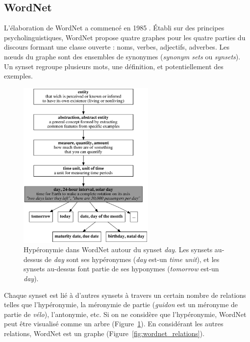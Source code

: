 \subsection{WordNet}
\label{presentation_wordnet}

L'élaboration de WordNet a commencé en 1985 \citep{miller1990introduction}.
Établi sur des principes psycholinguistiques, WordNet propose quatre graphes
pour les quatre parties du discours formant une classe ouverte : noms, verbes,
adjectifs, adverbes. Les nœuds du graphe sont des ensembles de synonymes
(\emph{synonym sets} ou \emph{synsets}). Un synset regroupe plusieurs mots, une
définition, et potentiellement des exemples.


\begin{figure}[t]
    \centering
    \includegraphics[width=0.6\textwidth]{fig/wordnet_hypernymy.png}
    \caption{\label{fig:wordnet_hypernymy}Hypéronymie dans WordNet autour du
        synset \emph{day}. Les synsets au-dessus de \emph{day} sont ses hypéronymes
        (\emph{day} est-un \emph{time unit}), et les synsets au-dessus font partie de
        ses hyponymes (\emph{tomorrow} est-un \emph{day}).}
\end{figure}

Chaque synset est lié à d'autres synsets à travers un certain nombre de
relations telles que l'hypéronymie, la méronymie de partie (\emph{guidon} est
un méronyme de partie de \emph{vélo}), l'antonymie, etc. Si on ne considère que
l'hypéronymie, WordNet peut être visualisé comme un arbre
(Figure~\ref{fig:wordnet_hypernymy}). En considérant les autres relations,
WordNet est un graphe (Figure~\ref{fig:wordnet_relations}).

